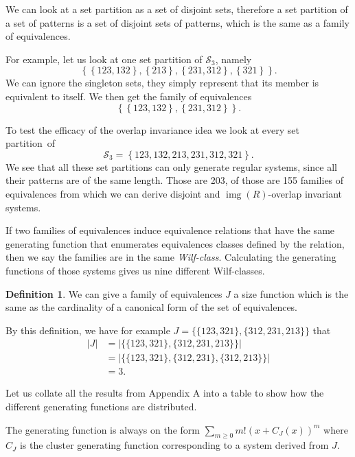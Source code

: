 \documentclass[a4paper, 11pt, english]{article}
\theoremstyle{definition}
\newtheorem{definition}[theorem]{Definition}
\newcommand{\Sym}{\mathcal{S}}
\DeclareMathOperator{\img}{img}
\begin{document}
We can look at a set partition as a set of disjoint sets, therefore a set partition of a set of
patterns is a set of disjoint sets of patterns, which is the same as a family of
equivalences.

For example, let us look at one set partition of $\Sym_3$, namely 
\[
  \left\{ \left\{ 123, 132 \right\}, \left\{ 213 \right\}, \left\{ 231, 312 \right\}, \left\{ 321
  \right\} \right\}.
\]
We can ignore the singleton sets, they simply represent that its member is equivalent to itself. We
then get the family of equivalences
\[
  \left\{ \left\{ 123, 132 \right\}, \left\{ 231, 312 \right\} \right\}.
\]

To test the efficacy of the overlap invariance idea we look at every set partition~of 
\[
  \Sym_3 = \left\{ 123, 132, 213, 231, 312, 321 \right\}.
\]
We see that all these set partitions can only generate regular systems, since all their patterns are of
the same length.
Those are 203, of those are 155 families of equivalences from which we can derive disjoint and
$\img(R)$-overlap invariant systems. 

If two families of equivalences induce equivalence relations that have the same generating function
that enumerates equivalences classes defined by the relation,
then we say the families are in the same \emph{Wilf-class}.
Calculating the generating functions of those systems gives us nine different Wilf-classes.

\begin{definition}
    We can give a family of equivalences $J$ a size function which is the same
    as the cardinality of a canonical form of the set of equivalences.

    By this definition, we have for example $J=\{ \{ 123, 321 \}, \{ 312, 231, 213 \} \}$ that
    \begin{align*}
      |J| & = \left| \{ \{ 123, 321 \}, \{ 312, 231, 213 \} \} \right| \\
         & = \left| \{ \{ 123, 321 \}, \{ 312, 231 \}, \{ 312, 213 \} \} \right| \\
         & = 3.
    \end{align*}
\end{definition}

Let us collate all the results from Appendix A into a table to show how the
different generating functions are distributed.

The generating function is always on the form $\sum_{m \geq 0}m!(x+C_J(x))^m$ where $C_J$
is the cluster generating function corresponding to a system derived from $J$.
\end{document}
